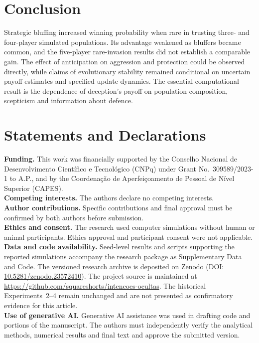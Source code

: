 \documentclass[11pt,a4paper]{article}
\begin{document}
\section{Conclusion}
Strategic bluffing increased winning probability when rare in trusting three- and four-player simulated populations. Its advantage weakened as bluffers became common, and the five-player rare-invasion results did not establish a comparable gain. The effect of anticipation on aggression and protection could be observed directly, while claims of evolutionary stability remained conditional on uncertain payoff estimates and specified update dynamics. The essential computational result is the dependence of deception's payoff on population composition, scepticism and information about defence.

\section*{Statements and Declarations}
\noindent\textbf{Funding.} This work was financially supported by the Conselho Nacional de Desenvolvimento Cient\'ifico e Tecnol\'ogico (CNPq) under Grant No.~309589/2023-1 to A.P., and by the Coordena\c{c}\~ao de Aperfei\c{c}oamento de Pessoal de N\'ivel Superior (CAPES).\\
\textbf{Competing interests.} The authors declare no competing interests.\\
\textbf{Author contributions.} Specific contributions and final approval must be confirmed by both authors before submission.\\
\textbf{Ethics and consent.} The research used computer simulations without human or animal participants. Ethics approval and participant consent were not applicable.\\
\textbf{Data and code availability.} Seed-level results and scripts supporting the reported simulations accompany the research package as Supplementary Data and Code. The versioned research archive is deposited on Zenodo (DOI: \href{https://doi.org/10.5281/zenodo.23572410}{10.5281/zenodo.23572410}). The project source is maintained at \url{https://github.com/squareshorts/intencoes-ocultas}. The historical Experiments~2--4 remain unchanged and are not presented as confirmatory evidence for this article.\\
\textbf{Use of generative AI.} Generative AI assistance was used in drafting code and portions of the manuscript. The authors must independently verify the analytical methods, numerical results and final text and approve the submitted version.

\printbibliography
\end{document}
